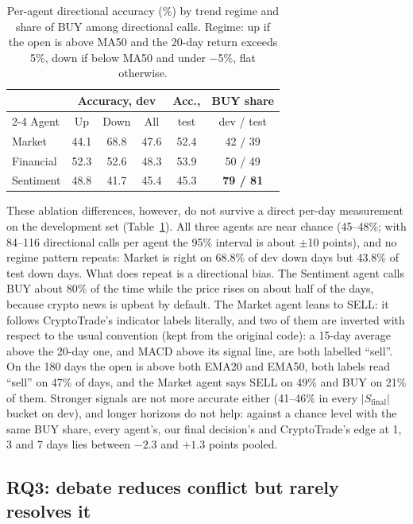\documentclass[11pt]{article}
\newcommand{\Sfinal}{S_{\text{final}}}
\begin{document}
\begin{table}[t]
\centering
\small
\setlength{\tabcolsep}{3pt}
\begin{tabular}{lccccc}
\toprule
 & \multicolumn{3}{c}{Accuracy, dev} & Acc., & BUY share \\
\cmidrule(lr){2-4}
Agent & Up & Down & All & test & dev / test \\
\midrule
Market & 44.1 & 68.8 & 47.6 & 52.4 & 42 / 39 \\
Financial & 52.3 & 52.6 & 48.3 & 53.9 & 50 / 49 \\
Sentiment & 48.8 & 41.7 & 45.4 & 45.3 & \textbf{79 / 81} \\
\bottomrule
\end{tabular}
\caption{Per-agent directional accuracy (\%) by trend regime and share of BUY among directional calls. Regime: up if
the open is above MA50 and the 20-day return exceeds 5\%, down if below MA50 and under $-$5\%, flat otherwise.}
\label{tab:agents}
\end{table}

These ablation differences, however, do not survive a direct per-day measurement on the development set
(Table~\ref{tab:agents}). All three agents are near chance (45--48\%; with 84--116 directional calls per agent the 95\%
interval is about $\pm$10 points), and no regime pattern repeats: Market is right on 68.8\% of dev down days but 43.8\%
of test down days. What does repeat is a directional bias. The Sentiment agent calls BUY about 80\% of the time while
the price rises on about half of the days, because crypto news is upbeat by default. The Market agent leans to SELL: it
follows CryptoTrade's indicator labels literally, and two of them are inverted with respect to the usual convention
(kept from the original code): a 15-day average above the 20-day one, and MACD above its signal line, are both labelled
``sell''. On the 180 days the open is above both EMA20 and EMA50, both labels read ``sell'' on 47\% of days, and the
Market agent says SELL on 49\% and BUY on 21\% of them. Stronger signals are not more accurate either (41--46\% in every
$|\Sfinal|$ bucket on dev), and longer horizons do not help: against a chance level with the same BUY share, every
agent's, our final decision's and CryptoTrade's edge at 1, 3 and 7 days lies between $-2.3$ and $+1.3$ points pooled.

\subsection{RQ3: debate reduces conflict but rarely resolves it}
\end{document}
